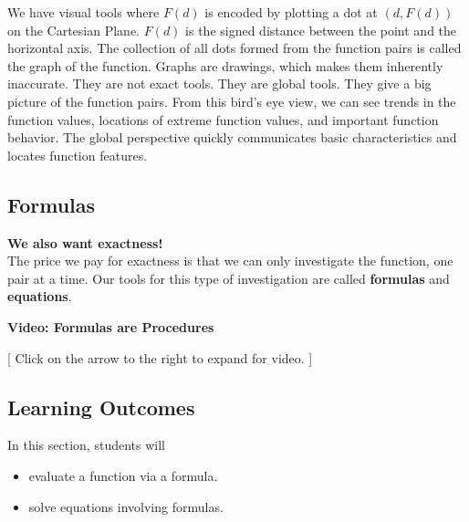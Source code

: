 \documentclass{ximera}
\begin{document}
We have visual tools where $F(d)$ is encoded by plotting a dot at $(d, F(d))$ on the Cartesian Plane.  $F(d)$ is the signed distance between the point and the horizontal axis. The collection of all dots formed from the function pairs is called the graph of the function. Graphs are drawings, which makes them inherently inaccurate.  They are not exact tools.  They are global tools.  They give a big picture of the function pairs.  From this bird's eye view, we can see trends in the function values, locations of extreme function values, and important function behavior. The global perspective quickly communicates basic characteristics and locates function features.












\subsection{Formulas}
\textbf{\textcolor{red!80!black}{We also want exactness!}} \\


The price we pay for exactness is that we can only investigate the function, one pair at a time.  Our tools for this type of investigation are called \textbf{formulas} and \textbf{equations}.








\begin{explanation} \textbf{Video: Formulas are Procedures}

[ Click on the arrow to the right to expand for video. ]
\begin{expandable} 

\begin{center}
\end{center}

\end{expandable}
\end{explanation}






\subsection{Learning Outcomes}

\begin{sectionOutcomes}
In this section, students will 

\begin{itemize}
\item evaluate a function via a formula.
\item solve equations involving formulas.
\end{itemize}
\end{sectionOutcomes}
\end{document}
